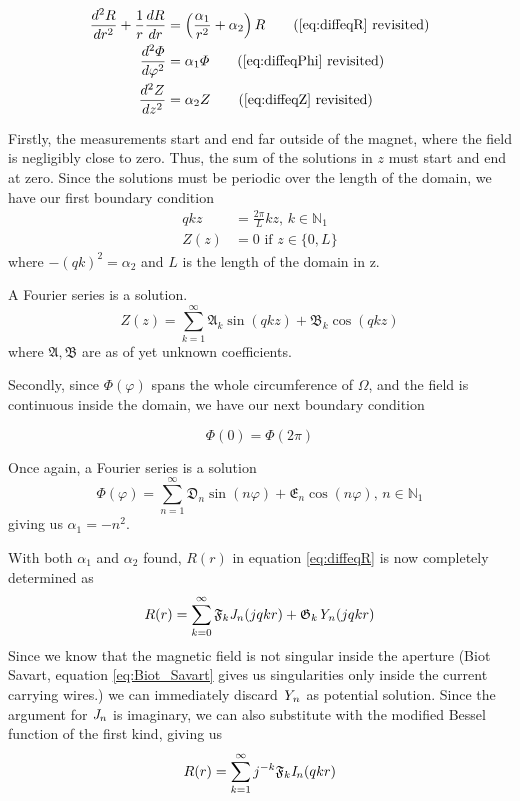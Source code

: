 \begin{align*}
    \frac{d^2R}{dr^2} + \frac{1}{r} \frac{dR}{dr} & =
    \left( \frac{\alpha_1}{r^2} + \alpha_2 \right)R
    \tag{\ref{eq:diffeqR} revisited}                                  \\
    \frac{d^2 \varPhi}{d\varphi^2}                & = \alpha_1\varPhi
    \tag{\ref{eq:diffeqPhi} revisited}                                \\
    \frac{d^2 Z}{dz^2}                            & = \alpha_2 Z
    \tag{\ref{eq:diffeqZ} revisited}
\end{align*}

Firstly, the measurements start and end far outside of the magnet,
where the field is negligibly close to zero. Thus, the sum of the solutions
in $z$ must start and end at zero. Since the solutions must be periodic
over the length of the domain, we have our first boundary condition
\begin{align}
    qkz  & = \frac{2\pi}{L}kz, \,k\in\mathbb{N}_1 \\
    Z(z) & = 0\text{ if } z\in\{0,L\}
\end{align}
where $-(qk)^2 = \alpha_2$ and $L$ is the length of the domain in z.

A Fourier series is a solution.
\begin{equation}
    Z(z) = \sum\limits_{k=1}^{\infty}
    \mathfrak{A}_k\sin{(qkz)} + \mathfrak{B}_k\cos{(qkz)}
\end{equation}
where $\mathfrak{A, B}$ are as of yet unknown coefficients.

Secondly, since $\varPhi(\varphi)$ spans the whole circumference of
$\Omega$, and the field is continuous inside the domain, we have
our next boundary condition

\begin{equation}
    \varPhi(0) = \varPhi(2\pi)
\end{equation}

Once again, a Fourier series is a solution
\begin{equation}
    \varPhi(\varphi) = \sum\limits_{n=1}^{\infty}
    \mathfrak{D}_n\sin{(n\varphi)} + \mathfrak{E}_n\cos{(n\varphi)}
    , \, n\in\mathbb{N}_1
\end{equation}
giving us $\alpha_1 = -n^2$.

With both $\alpha_1$ and $\alpha_2$ found, $R(r)$ in equation \ref{eq:diffeqR}
is now completely determined as
\begin{equation}
    R(r) = \sum\limits_{k=0}^{\infty}
    \mathfrak{F}_{k}\mathit{J}_{n}(jqkr) + \mathfrak{G}_k\mathit{Y}_{n}(jqkr)
\end{equation}
Since we know that the magnetic field is not singular inside the aperture
(Biot Savart, equation \ref{eq:Biot_Savart} gives us singularities only inside
the current carrying wires.) we can immediately discard $\mathit{Y}_{n}$ as potential
solution. Since the argument for $\mathit{J}_{n}$ is imaginary, we can also substitute
with the modified Bessel function of the first kind, giving us
\begin{equation}
    R(r) = \sum\limits_{k=1}^{\infty}
    j^{-k}\mathfrak{F}_{k}\mathit{I}_{n}(qkr)
\end{equation}

